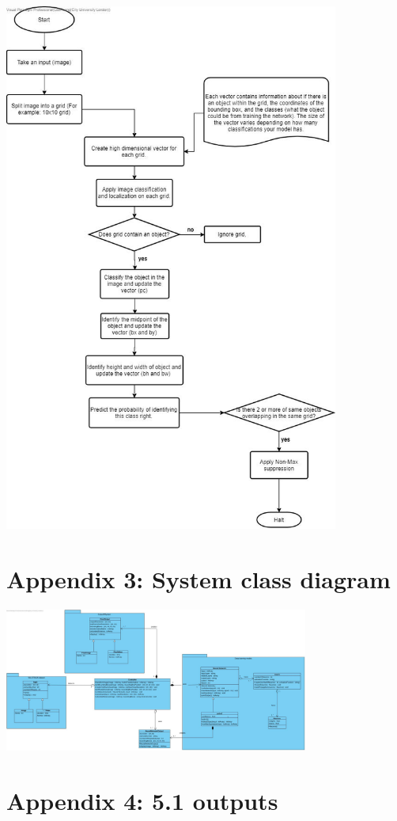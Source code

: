 \documentclass[12pt]{report}
\begin{document}
\includegraphics[width=110mm]{./images/YOLO.jpg}

\pagebreak
\section*{Appendix 3: System class diagram}

\includegraphics[angle = 90,width=100mm]{./images/SD Class diagram.jpg}

\pagebreak
\section*{Appendix 4: 5.1 outputs}
\end{document}
